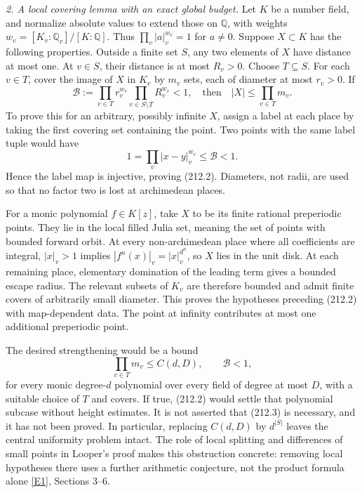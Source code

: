 \documentclass[11pt,a4paper]{article}
\newcommand{\Q}{\mathbb{Q}}
\newcommand{\eref}[2]{\hyperlink{extra:#1:#2}{[E#2]}}
\begin{document}
\textit{2. A local covering lemma with an exact global budget.}
Let $K$ be a number field, and normalize absolute values to extend those on
$\Q$, with weights $w_v=[K_v:\Q_v]/[K:\Q]$. Thus
$\prod_v|a|_v^{w_v}=1$ for $a\ne0$. Suppose $X\subset K$ has the following
properties. Outside a finite set $S$, any two elements of $X$ have distance
at most one. At $v\in S$, their distance is at most $R_v>0$. Choose
$T\subseteq S$. For each $v\in T$, cover the image of $X$ in $K_v$ by
$m_v$ sets, each of diameter at most $r_v>0$. If
\[
 \mathcal B:=\prod_{v\in T}r_v^{w_v}
             \prod_{v\in S\setminus T}R_v^{w_v}<1,
 \quad\text{then}\quad |X|\le\prod_{v\in T}m_v.                 \tag{212.2}
\]
To prove this for an arbitrary, possibly infinite $X$, assign a label at
each place by taking the first covering set containing the point. Two
points with the same label tuple would have
\[
 1=\prod_v|x-y|_v^{w_v}\le\mathcal B<1.
\]
Hence the label map is injective, proving (212.2). Diameters, not radii,
are used so that no factor two is lost at archimedean places.

For a monic polynomial $f\in K[z]$, take $X$ to be its finite rational
preperiodic points. They lie in the local filled Julia set, meaning the set
of points with bounded forward orbit. At every non-archimedean place where
all coefficients are integral, $|x|_v>1$ implies
$|f^n(x)|_v=|x|_v^{d^n}$, so $X$ lies in the unit disk. At each remaining
place, elementary domination of the leading term gives a bounded escape
radius. The relevant subsets of $K_v$ are therefore bounded and admit finite
covers of arbitrarily small diameter. This proves the hypotheses preceding
(212.2) with map-dependent data. The point at infinity contributes at most
one additional preperiodic point.

The desired strengthening would be a bound
\[
 \prod_{v\in T}m_v\le C(d,D),\qquad\mathcal B<1,                \tag{212.3}
\]
for every monic degree-$d$ polynomial over every field of degree at most
$D$, with a suitable choice of $T$ and covers. If true, (212.2) would settle
that polynomial subcase without height estimates. It is not asserted that
(212.3) is necessary, and it has not been proved. In particular, replacing
$C(d,D)$ by $d^{|S|}$ leaves the central uniformity problem intact. The role
of local splitting and differences of small points in Looper's proof makes
this obstruction concrete: removing local hypotheses there uses a further
arithmetic conjecture, not the product formula alone \eref{30006792}{1},
Sections 3--6.
\end{document}
